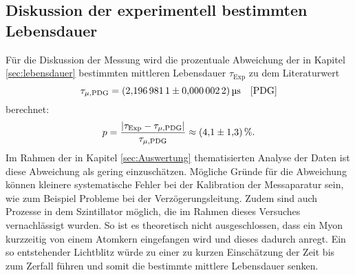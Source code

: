 \subsection{Diskussion der experimentell bestimmten Lebensdauer}
Für die Diskussion der Messung wird die prozentuale Abweichung der in Kapitel \ref{sec:lebensdauer} bestimmten mittleren Lebensdauer $\tau_\text{Exp}$ 
zu dem Literaturwert 
\begin{equation*}
    \tau_{\mu,\text{PDG}}=\SI{2.1969811 \pm0.0000022}{\micro\second} \quad\text{\cite{PDG}}    
\end{equation*}
berechnet:
\begin{equation*}
    p=\frac{|\tau_\text{Exp}-\tau_{\mu,\text{PDG}}|}{\tau_{\mu,\text{PDG}}}\approx \SI{4.1\pm1.3}{\percent}.
\end{equation*}
Im Rahmen der in Kapitel \ref{sec:Auswertung} thematisierten Analyse der Daten ist diese Abweichung als gering einzuschätzen. Mögliche Gründe für die Abweichung
können kleinere systematische Fehler bei der Kalibration der Messaparatur sein, wie zum Beispiel Probleme bei der Verzögerungsleitung. Zudem sind auch Prozesse in dem
Szintillator möglich, die im Rahmen dieses Versuches vernachlässigt wurden. So ist es theoretisch nicht ausgeschlossen, dass ein Myon kurzzeitig von einem Atomkern 
eingefangen wird und dieses dadurch anregt. Ein so entstehender Lichtblitz würde zu einer zu kurzen Einschätzung der Zeit bis zum Zerfall führen und somit die 
bestimmte mittlere Lebensdauer senken.
